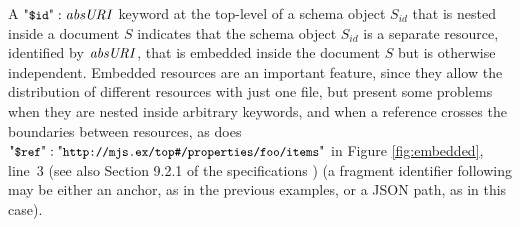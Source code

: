 A $\qdid : \key{absURI}$ keyword at the top-level of a schema object $S_{\ensuremath{id}}$ that is nested inside a {\JS} document 
$S$ indicates that the schema
object $S_{\ensuremath{id}}$ is a separate resource, identified by $\mathit{absURI}$, that is embedded inside the document $S$ but is otherwise 
independent.
Embedded resources are an important feature, since they allow the distribution of different resources with just one file,
but present some problems when they are nested inside arbitrary keywords,
and when a reference crosses the boundaries between resources, as does $\qdref: \qkw{http://mjs.ex/top\#/properties/foo/items}$
in Figure \ref{fig:embedded}, line~3 
(see also Section 9.2.1 of the specifications \citep{specs2020})
(a fragment identifier following \qkw{\#} may be either an anchor, as in the previous examples, or a JSON path, as in this case). 


